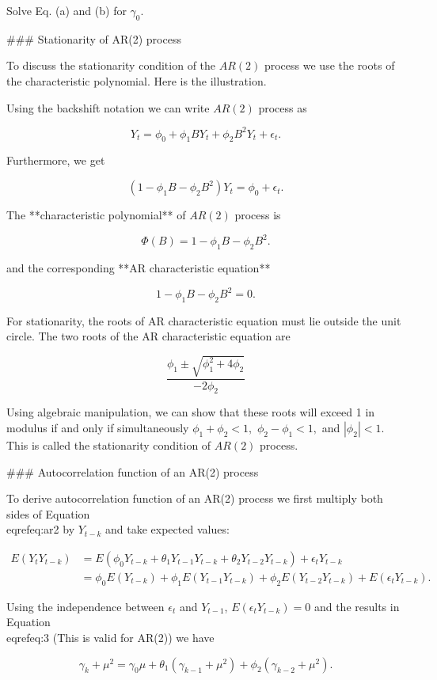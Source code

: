 \documentclass[11pt,a4paper,]{article}
\begin{document}
{Solve Eq. (a) and (b) for $\gamma_0.$

### Stationarity of AR(2) process

To discuss the stationarity condition of the $AR(2)$ process we use the roots of the characteristic polynomial. Here is the illustration. 

Using the backshift notation we can write $AR(2)$ process as 

$$Y_t = \phi_0 + \phi_1 BY_{t} + \phi_2 B^2 Y_{t} + \epsilon_t.$$

Furthermore, we get

$$(1-\phi_1 B - \phi_2 B^2) Y_t = \phi_0 + \epsilon_t.$$

The **characteristic polynomial** of $AR(2)$ process is 

$$\Phi(B)=1-\phi_1 B - \phi_2 B^2.$$

and the corresponding **AR characteristic equation**

$$1-\phi_1 B - \phi_2 B^2=0.$$


For stationarity, the roots of AR characteristic equation must lie outside the unit circle. The two roots of the AR characteristic equation are 

$$\frac{\phi_1 \pm \sqrt{\phi_1^2 + 4\phi_2}}{-2\phi_2}$$

Using algebraic manipulation, we can show that these roots will exceed 1 in modulus if and only if simultaneously $\phi_1 + \phi_2 < 1,$ $\phi_2-\phi_1 < 1,$ and $|\phi_2| < 1.$ This is called the stationarity condition of $AR(2)$ process.


### Autocorrelation function of an AR(2) process

To derive autocorrelation function of an AR(2) process we first multiply both sides of  Equation \\eqref{eq:ar2} by $Y_{t-k}$ and take expected values:


\begin{align}
E(Y_tY_{t-k}) &= E(\phi_0Y_{t-k}+\theta_1Y_{t-1}Y_{t-k}+\theta_2Y_{t-2}Y_{t-k})+\epsilon_tY_{t-k} \\
&= \phi_0 E(Y_{t-k})+\phi_{1}E(Y_{t-1}Y_{t-k}) + \phi_2 E(Y_{t-2} Y_{t-k}) + E(\epsilon_tY_{t-k}).
\end{align}


Using the independence between $\epsilon_t$ and $Y_{t-1}$, $E(\epsilon_t Y_{t-k})=0$ and the results in Equation \\eqref{eq:3} (This is valid for AR(2)) we have

$$\gamma_k + \mu^2 = \gamma_0 \mu + \theta_1 (\gamma_{k-1}+\mu^2)+\phi_2 (\gamma_{k-2}+\mu^2).$$

}
\end{document}
